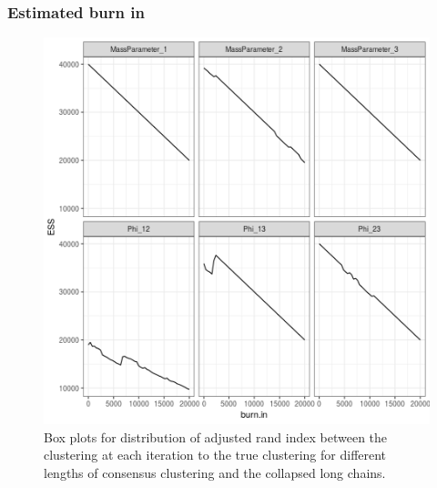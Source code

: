 \documentclass[12pt]{article} %
\begin{document}
\subsubsection{Estimated burn in}
\begin{figure}[h]
	\centering
	\includegraphics[scale=0.65]{Images/Gen_data/Case_1/Esimated_burn_in_plot_1.png}
	\caption{Box plots for distribution of adjusted rand index between the clustering at each iteration to the true clustering for different lengths of consensus clustering and the collapsed long chains.}
	\label{fig:case_1_esimated_burn_in_plot_1}
\end{figure}

\newpage
\end{document}

